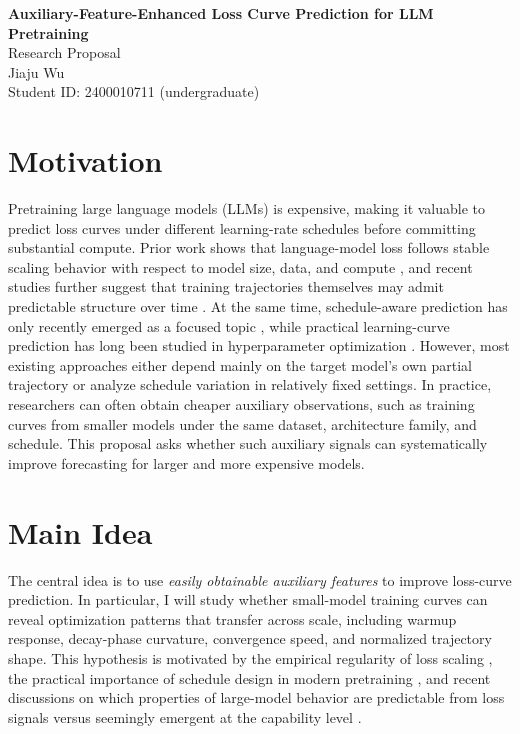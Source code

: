 \documentclass[10pt]{article}
\begin{document}
\begin{center}
    {\LARGE \textbf{Auxiliary-Feature-Enhanced Loss Curve Prediction for LLM Pretraining}}\\[8pt]
    {\large Research Proposal}\\[4pt]
    {\normalsize Jiaju Wu}\\[2pt]
    {\small Student ID: 2400010711 (undergraduate)}
\end{center}

\section{Motivation}
Pretraining large language models (LLMs) is expensive, making it valuable to predict loss curves under different learning-rate schedules before committing substantial compute. Prior work shows that language-model loss follows stable scaling behavior with respect to model size, data, and compute \cite{kaplan2020scaling, hoffmann2022training, gadre2024overtraining}, and recent studies further suggest that training trajectories themselves may admit predictable structure over time \cite{xiong2025temporal, bordelon2024dynamical}. At the same time, schedule-aware prediction has only recently emerged as a focused topic \cite{luo2025multipower}, while practical learning-curve prediction has long been studied in hyperparameter optimization \cite{domhan2015speeding, klein2017learning}. However, most existing approaches either depend mainly on the target model's own partial trajectory or analyze schedule variation in relatively fixed settings. In practice, researchers can often obtain cheaper auxiliary observations, such as training curves from smaller models under the same dataset, architecture family, and schedule. This proposal asks whether such auxiliary signals can systematically improve forecasting for larger and more expensive models.

\section{Main Idea}
The central idea is to use \emph{easily obtainable auxiliary features} to improve loss-curve prediction. In particular, I will study whether small-model training curves can reveal optimization patterns that transfer across scale, including warmup response, decay-phase curvature, convergence speed, and normalized trajectory shape. This hypothesis is motivated by the empirical regularity of loss scaling \cite{kaplan2020scaling, hoffmann2022training}, the practical importance of schedule design in modern pretraining \cite{hu2024minicpm, luo2025multipower}, and recent discussions on which properties of large-model behavior are predictable from loss signals versus seemingly emergent at the capability level \cite{ganguli2022predictability, schaeffer2023mirage, du2024loss}.
\end{document}
